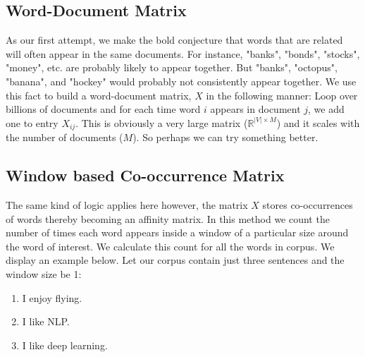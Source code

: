 \documentclass[nobib]{tufte-handout}
\begin{document}
\subsection{Word-Document Matrix}
As our first attempt, we make the bold conjecture that words that are related will often appear in the same documents. For instance, "banks", "bonds", "stocks", "money", etc. are probably likely to appear together. But "banks", "octopus", "banana", and "hockey" would probably not consistently appear together. We use this fact to build a word-document matrix, $X$ in the following manner: Loop over billions of documents and for each time word $i$ appears in document $j$, we add one to entry $X_{ij}$. This is obviously a very large matrix ($\mathbb{R}^{|V|\times M}$) and it scales with the number of documents ($M$). So perhaps we can try something better.



\subsection{Window based Co-occurrence Matrix}
The same kind of logic applies here however, the matrix $X$ stores co-occurrences of words thereby becoming an affinity matrix. In this method we count the number of times each word appears inside a window of a particular size around the word of interest. We calculate this count for all the words in corpus. We display an example below. Let our corpus contain just three sentences and the window size be 1:



\begin{enumerate}
\item I enjoy flying.
\item I like NLP.
\item I like deep learning.
\end{enumerate}
\end{document}
